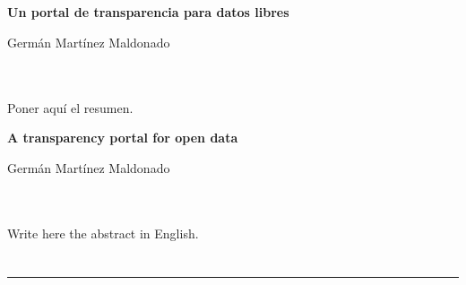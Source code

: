 \chapter*{}




\cleardoublepage
\thispagestyle{empty}

\begin{center}
{\large\bfseries Un portal de transparencia para datos libres}\\
\end{center}
\begin{center}
Germán Martínez Maldonado\\
\end{center}

\\

\vspace{0.7cm}
\\

Poner aquí el resumen.
\cleardoublepage


\thispagestyle{empty}


\begin{center}
{\large\bfseries A transparency portal for open data}\\
\end{center}
\begin{center}
Germán Martínez Maldonado\\
\end{center}

\\

\vspace{0.7cm}
\\

Write here the abstract in English.

\chapter*{}
\thispagestyle{empty}

\noindent\rule[-1ex]{\textwidth}{2pt}\\[4.5ex]

